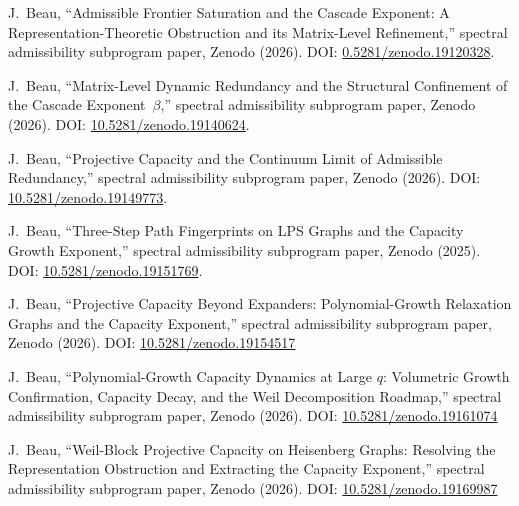 J.~Beau,
``Admissible Frontier Saturation and the Cascade Exponent: A Representation-Theoretic Obstruction and its Matrix-Level
Refinement,''
spectral admissibility subprogram paper, Zenodo (2026).
DOI: \href{https://doi.org/10.5281/zenodo.19120328}{0.5281/zenodo.19120328}.

J.~Beau,
``Matrix-Level Dynamic Redundancy and the Structural Confinement of the Cascade Exponent~$\beta$,''
spectral admissibility subprogram paper, Zenodo (2026).
DOI: \href{https://doi.org/10.5281/zenodo.19140624}{10.5281/zenodo.19140624}.

J.~Beau,
``Projective Capacity and the Continuum Limit of Admissible Redundancy,''
spectral admissibility subprogram paper, Zenodo (2026).
DOI: \href{https://doi.org/10.5281/zenodo.19149773}{10.5281/zenodo.19149773}.

J.~Beau,
``Three-Step Path Fingerprints on LPS Graphs and the Capacity Growth Exponent,''
spectral admissibility subprogram paper, Zenodo (2025).
DOI: \href{https://doi.org/10.5281/zenodo.19151769}{10.5281/zenodo.19151769}.

J.~Beau,
``Projective Capacity Beyond Expanders: Polynomial-Growth Relaxation Graphs and the Capacity Exponent,''
spectral admissibility subprogram paper, Zenodo (2026).
DOI: \href{https://doi.org/10.5281/zenodo.19154517}{10.5281/zenodo.19154517}

J.~Beau,
``Polynomial-Growth Capacity Dynamics at Large $q$: Volumetric Growth Confirmation, Capacity Decay, and the Weil
Decomposition Roadmap,''
spectral admissibility subprogram paper, Zenodo (2026).
DOI: \href{https://doi.org/10.5281/zenodo.19161074}{10.5281/zenodo.19161074}

J.~Beau,
``Weil-Block Projective Capacity on Heisenberg Graphs: Resolving the Representation Obstruction and Extracting the
Capacity Exponent,''
  spectral admissibility subprogram paper, Zenodo (2026).
  DOI: \href{https://doi.org/10.5281/zenodo.19169987}{10.5281/zenodo.19169987}
